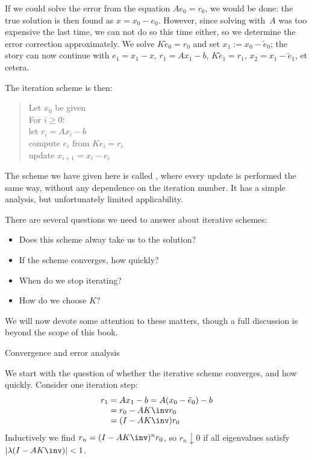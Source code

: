 If we could solve the error from the equation $Ae_0=r_0$, we would be
done: the true solution is then found as $x=x_0-e_0$. However,
since solving with~$A$ was
too expensive the last time, we can not do so this time either, so we
determine the error correction approximately.
We solve $K\tilde e_0=r_0$ and set $x_1:=x_0-\tilde e_0$; the story can now
continue with $e_1=x_1-x$, $r_1=Ax_1-b$, $K\tilde e_1=r_1$,
$x_2=x_1-\tilde e_1$, et cetera.

The iteration scheme is then:
  \begin{quote}
\begin{tabbing}
  Let $x_0$ be given\\
  For $i\geq0$\=:\\
  \>let $r_i=Ax_i-b$\\
  \>compute $e_i$ from $Ke_i=r_i$\\
  \>update $x_{i+1}=x_i-e_i$
\end{tabbing}
  \end{quote}
The scheme we have given here is called ,
where every update is performed the same way, without any dependence
on the iteration number. It has a simple analysis, but
unfortunately limited applicability.

There are several questions we need to answer about iterative schemes:
\begin{itemize}
\item Does this scheme alway take us to the solution?
\item If the scheme converges, how quickly?
\item When do we stop iterating?
\item How do we choose $K$?
\end{itemize}
We will now devote some attention to these matters, though a full
discussion is beyond the scope of this book.

 {Convergence and error analysis}
\label{sec:stationary-convergence}

We start with the question of whether the iterative scheme converges,
and how quickly. Consider one iteration step:
\begin{equation}
  \begin{array}{r@{{}={}}l}
    r_1&Ax_1-b=A(x_0-\tilde e_0)-b\\
    &r_0-AK\inv r_0\\
    &(I-AK\inv)r_0
  \end{array}
\end{equation}
Inductively we find $r_n=(I-AK\inv)^nr_0$, so $r_n\downarrow0$ if
  all eigenvalues satisfy $|\lambda(I-AK\inv)|<1$.


